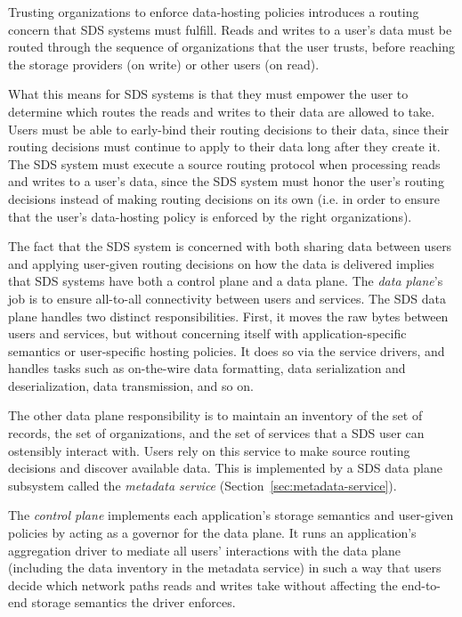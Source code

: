 Trusting organizations to enforce data-hosting policies introduces a routing
concern that SDS systems must fulfill.  Reads and writes to a user's data
must be routed through the sequence of organizations that the user trusts,
before reaching the storage providers (on write) or other users (on read).

What this means for SDS systems is that they must empower the user to determine
which routes the reads and writes to their data are allowed to take.  Users 
must be able to early-bind their routing decisions to their data, since their
routing decisions must continue to apply to their
data long after they create it.  The SDS system must execute a 
source routing protocol when processing reads and writes to a user's data, since
the SDS system must honor the user's routing decisions instead of making routing
decisions on its own (i.e. in order to ensure that the user's data-hosting
policy is enforced by the right organizations).

The fact that the SDS system is concerned with both sharing data between users
and applying user-given routing decisions on how the data is delivered implies
that SDS systems have both a control plane and a data plane.
The \emph{data plane}'s job
is to ensure all-to-all connectivity between users and services.
The SDS data plane handles two distinct responsibilities.  First, it moves the
raw bytes between users and services, but without concerning itself with application-specific semantics or
user-specific hosting policies.  It does so via the 
service drivers, and handles tasks such as
on-the-wire data formatting, data serialization and deserialization, data
transmission, and so on.

The other data plane responsibility is to maintain an inventory of the
set of records, the set of organizations, and the set of services that a SDS
user can ostensibly interact with.  Users rely on this service to 
make source routing decisions and discover available data.
This is implemented by a SDS data plane
subsystem called the \emph{metadata service}
(Section~\ref{sec:metadata-service}).

The \emph{control plane} implements each application's
storage semantics and user-given policies by acting as a governor for the data plane.
It runs an application's aggregation driver 
to mediate all users' interactions with the data plane (including the data
inventory in the metadata service) in such a way that
users decide which network paths reads and writes take without 
affecting the end-to-end storage semantics the driver enforces.

